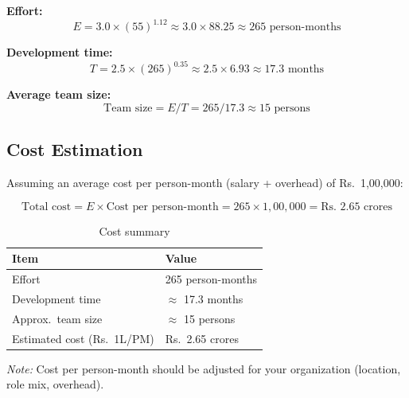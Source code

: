 \documentclass[12pt,a4paper]{article}
\newcommand{\sdlcsubsection}[1]{%
  \needspace{7\baselineskip}%
  \subsection*{\fontsize{14pt}{1.2}\selectfont #1}%
  \nopagebreak
}
\begin{document}
\textbf{Effort:}
\[
  E = 3.0 \times (55)^{1.12} \approx 3.0 \times 88.25 \approx 265 \text{ person-months}
\]

\textbf{Development time:}
\[
  T = 2.5 \times (265)^{0.35} \approx 2.5 \times 6.93 \approx 17.3 \text{ months}
\]

\textbf{Average team size:}
\[
  \text{Team size} = E / T = 265 / 17.3 \approx 15 \text{ persons}
\]

\sdlcsubsection{Cost Estimation}

Assuming an average cost per person-month (salary + overhead) of Rs.\ 1,00,000:

\[
  \text{Total cost} = E \times \text{Cost per person-month} = 265 \times 1{,}00{,}000 = \text{Rs.\ 2.65 crores}
\]

\begin{table}[htbp]
  \centering
  \caption{Cost summary}
  \begin{tabular}{@{}ll@{}}
    \toprule
    \textbf{Item}               & \textbf{Value}          \\
    \midrule
    Effort                      & 265 person-months       \\
    Development time            & \(\approx\) 17.3 months \\
    Approx.\ team size          & \(\approx\) 15 persons  \\
    Estimated cost (Rs.\ 1L/PM) & Rs.\ 2.65 crores        \\
    \bottomrule
  \end{tabular}
\end{table}

\noindent\textit{Note:} Cost per person-month should be adjusted for your organization (location, role mix, overhead).
\end{document}
